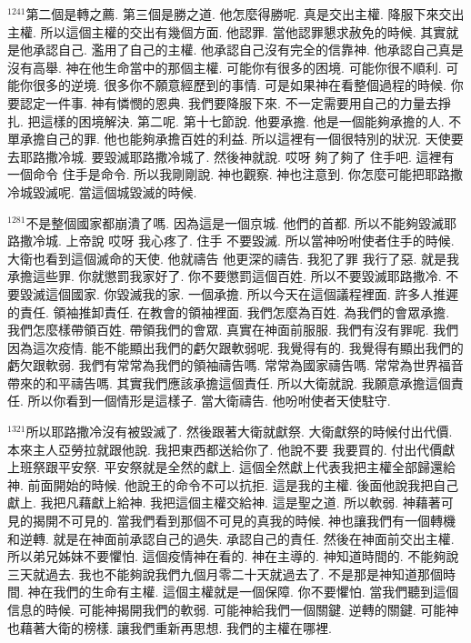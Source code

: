 \documentclass{book}
\begin{document}
$^{1241}$第二個是轉之薦.
第三個是勝之道.
他怎麼得勝呢.
真是交出主權.
降服下來交出主權.
所以這個主權的交出有幾個方面.
他認罪.
當他認罪懇求赦免的時候.
其實就是他承認自己.
濫用了自己的主權.
他承認自己沒有完全的信靠神.
他承認自己真是沒有高舉.
神在他生命當中的那個主權.
可能你有很多的困境.
可能你很不順利.
可能你很多的逆境.
很多你不願意經歷到的事情.
可是如果神在看整個過程的時候.
你要認定一件事.
神有憐憫的恩典.
我們要降服下來.
不一定需要用自己的力量去掙扎.
把這樣的困境解決.
第二呢.
第十七節說.
他要承擔.
他是一個能夠承擔的人.
不單承擔自己的罪.
他也能夠承擔百姓的利益.
所以這裡有一個很特別的狀況.
天使要去耶路撒冷城.
要毀滅耶路撒冷城了.
然後神就說.
哎呀 夠了夠了 住手吧.
這裡有一個命令 住手是命令.
所以我剛剛說.
神也觀察.
神也注意到.
你怎麼可能把耶路撒冷城毀滅呢.
當這個城毀滅的時候.

$^{1281}$不是整個國家都崩潰了嗎.
因為這是一個京城.
他們的首都.
所以不能夠毀滅耶路撒冷城.
上帝說 哎呀 我心疼了.
住手 不要毀滅.
所以當神吩咐使者住手的時候.
大衛也看到這個滅命的天使.
他就禱告 他更深的禱告.
我犯了罪 我行了惡.
就是我承擔這些罪.
你就懲罰我家好了.
你不要懲罰這個百姓.
所以不要毀滅耶路撒冷.
不要毀滅這個國家.
你毀滅我的家.
一個承擔.
所以今天在這個議程裡面.
許多人推遲的責任.
領袖推卸責任.
在教會的領袖裡面.
我們怎麼為百姓.
為我們的會眾承擔.
我們怎麼樣帶領百姓.
帶領我們的會眾.
真實在神面前服服.
我們有沒有罪呢.
我們因為這次疫情.
能不能顯出我們的虧欠跟軟弱呢.
我覺得有的.
我覺得有顯出我們的虧欠跟軟弱.
我們有常常為我們的領袖禱告嗎.
常常為國家禱告嗎.
常常為世界福音帶來的和平禱告嗎.
其實我們應該承擔這個責任.
所以大衛就說.
我願意承擔這個責任.
所以你看到一個情形是這樣子.
當大衛禱告.
他吩咐使者天使駐守.

$^{1321}$所以耶路撒冷沒有被毀滅了.
然後跟著大衛就獻祭.
大衛獻祭的時候付出代價.
本來主人亞勞拉就跟他說.
我把東西都送給你了.
他說不要 我要買的.
付出代價獻上班祭跟平安祭.
平安祭就是全然的獻上.
這個全然獻上代表我把主權全部歸還給神.
前面開始的時候.
他說王的命令不可以抗拒.
這是我的主權.
後面他說我把自己獻上.
我把凡藉獻上給神.
我把這個主權交給神.
這是聖之道.
所以軟弱.
神藉著可見的揭開不可見的.
當我們看到那個不可見的真我的時候.
神也讓我們有一個轉機和逆轉.
就是在神面前承認自己的過失.
承認自己的責任.
然後在神面前交出主權.
所以弟兄姊妹不要懼怕.
這個疫情神在看的.
神在主導的.
神知道時間的.
不能夠說三天就過去.
我也不能夠說我們九個月零二十天就過去了.
不是那是神知道那個時間.
神在我們的生命有主權.
這個主權就是一個保障.
你不要懼怕.
當我們聽到這個信息的時候.
可能神揭開我們的軟弱.
可能神給我們一個關鍵.
逆轉的關鍵.
可能神也藉著大衛的榜樣.
讓我們重新再思想.
我們的主權在哪裡.
\end{document}
